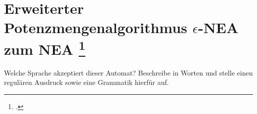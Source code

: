 \documentclass{lehramt-informatik-aufgabe}
\begin{document}
\section{Erweiterter Potenzmengenalgorithmus $\epsilon$-NEA zum NEA
\index{}
\footcite[Seite 47-49]{theo:fs:1}}

Welche Sprache akzeptiert dieser Automat? Beschreibe in Worten
und stelle einen regulären Ausdruck sowie eine Grammatik hierfür
auf.
\end{document}
